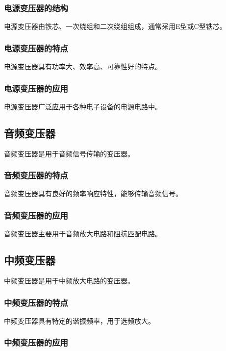 \documentclass[12pt,UTF8]{ctexbook}
\begin{document}
\subsubsection{电源变压器的结构}

电源变压器由铁芯、一次绕组和二次绕组组成，通常采用E型或C型铁芯。

\subsubsection{电源变压器的特点}

电源变压器具有功率大、效率高、可靠性好的特点。

\subsubsection{电源变压器的应用}

电源变压器广泛应用于各种电子设备的电源电路中。

\subsection{音频变压器}

音频变压器是用于音频信号传输的变压器。

\subsubsection{音频变压器的特点}

音频变压器具有良好的频率响应特性，能够传输音频信号。

\subsubsection{音频变压器的应用}

音频变压器主要用于音频放大电路和阻抗匹配电路。

\subsection{中频变压器}

中频变压器是用于中频放大电路的变压器。

\subsubsection{中频变压器的特点}

中频变压器具有特定的谐振频率，用于选频放大。

\subsubsection{中频变压器的应用}
\end{document}
